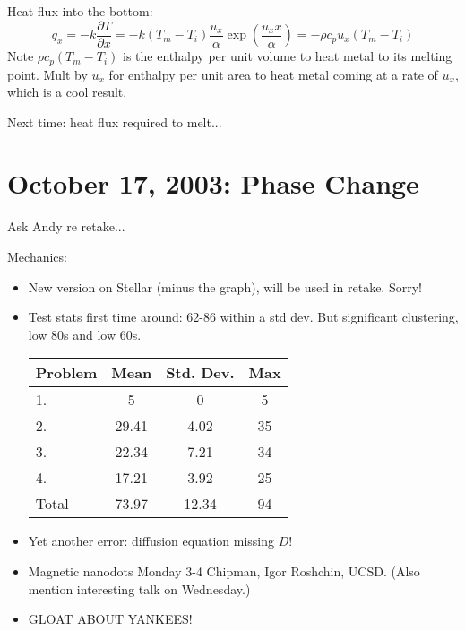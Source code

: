\documentclass{report}
\begin{document}
Heat flux into the bottom:
$$q_x=-k\frac{\partial T}{\partial x} =
-k(T_m-T_i)\frac{u_x}{\alpha}\exp\left(\frac{u_x x}{\alpha}\right) =
-\rho c_p u_x (T_m-T_i)$$
Note $\rho c_p(T_m-T_i)$ is the enthalpy per unit volume to heat metal to its
melting point.  Mult by $u_x$ for enthalpy per unit area to heat metal coming
at a rate of $u_x$, which is a cool result.

Next time: heat flux required to melt...
\newpage


\section{October 17, 2003: Phase Change}

Ask Andy re retake...

\noindent Mechanics:
\begin{itemize}
\item New version on Stellar (minus the graph), will be used in retake.  Sorry!
\item Test stats first time around: 62-86 within a std dev.  But significant clustering, low 80s and low 60s.
  \begin{center}
    \begin{tabular}{l|ccc|}
      Problem & Mean & Std. Dev. & Max \\ \hline
      1. & 5 & 0 & 5 \\
      2. & 29.41 & 4.02 & 35 \\
      3. & 22.34 & 7.21 & 34 \\
      4. & 17.21 & 3.92 & 25 \\ \hline
      Total & 73.97 & 12.34 & 94 \\ \hline
    \end{tabular}
  \end{center}
\item Yet another error: diffusion equation missing $D$!
\item Magnetic nanodots Monday 3-4 Chipman, Igor Roshchin, UCSD.  (Also mention
  interesting talk on Wednesday.)
\item GLOAT ABOUT YANKEES!
\end{itemize}
\end{document}
